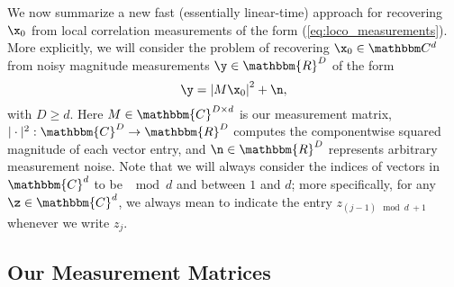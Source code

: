 %
%
We now summarize a new %
fast (essentially linear-time) approach for recovering $\x_0$ from local
correlation measurements of the form (\ref{eq:loco_measurements}). 
More explicitly, we will consider the problem of recovering $\x_0 \in \mathbbm C^d$ from noisy
magnitude measurements $\y \in \mathbbm{R}^D$ of the form 
%
\begin{equation}
    \y = \left | M \x_0 \right |^2 + \n, 
    \label{equ:MeasModel}
\end{equation}
%
with $D \geq d$.  Here $M \in \mathbbm{C}^{D \times d}$ is our
measurement matrix, $| \cdot |^2: \mathbbm{C}^D \rightarrow
\mathbbm{R}^D$ computes the  componentwise squared magnitude of each
vector entry, and $\n \in \mathbbm{R}^D$ represents arbitrary
measurement noise.  Note that we will always consider the indices of vectors in
$\mathbbm{C}^d$ to be $\mod d$ and between $1$ and $d$; more
specifically, for any $\z \in \mathbbm{C}^d$, we always mean to indicate the entry 
$z_{(j-1) \mod d \ + 1}$ whenever we write $z_j$.

\subsection{Our Measurement Matrices}
\label{sec:MeasMatrix}

